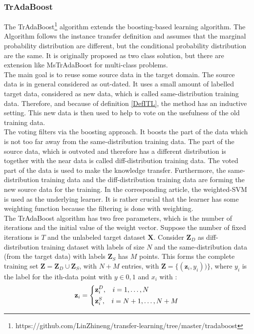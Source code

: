 \subsubsection{TrAdaBoost}
The TrAdaBoost\footnote{https://github.com/LinZhineng/transfer-learning/tree/master/tradaboost} algorithm extends the boosting-based learning algorithm.
The Algorithm follows the instance transfer definition and assumes that the marginal probability distribution are different, but the conditional probability distribution are the same.\cite{Dai.}
It is originally proposed as two class solution, but there are extension like MsTrAdaBoost for multi-class problems.\cite{Huang.2012}\\
The main goal is to reuse some source data in the target domain.
The source data is in general considered as out-dated.
It uses a small amount of labelled target data, considered as new data, which is called same-distribution training data.
Therefore, and because of definition \ref{DefITL}, the method has an inductive setting.
This new data is then used to help to vote on the usefulness of the old training data.\cite{Dai.}\\
The voting filters via the boosting approach.
It boosts the part of the data which is not too far away from the same-distribution training data.
The part of the source data, which is outvoted and therefore has a different distribution is together with the near data is called diff-distribution training data.
The voted part of the data is used to make the knowledge transfer.
Furthermore, the same-distribution training data and the diff-distribution training data are forming the new source data for the training.
In the corresponding article, the weighted-\acs{SVM} is used as the underlying learner.
It is rather crucial that the learner has some weighting function because the filtering is done with weighting.\cite{Dai.}\\
The TrAdaBoost algorithm has two free parameters, which is the number of iterations and the initial value of the weight vector.
Suppose the number of fixed iterations is $T$ and the unlabeled target dataset $\mathbf{X}$.
Consider $\mathbf{Z}_D$ as diff-distribution training dataset with labels of size $N$ and the same-distribution data (from the target data) with labels $\mathbf{Z}_S$ has $M$ points.
This forms the complete training set $\mathbf{Z}=\mathbf{Z}_D\cup \mathbf{Z}_S$, with $N+M$ entries, with $\mathbf{\mathbf{Z}}=\{(\mathbf{z}_i,y_i))\}$, where $y_i$ is the label for the ith-data point with $y\in {0,1}$ and $x_i$ with \cite{Dai.}:
\begin{equation*}
	\mathbf{z}_i = \begin{dcases}
						\mathbf{z}_i^D, \>\>\>\> i = 1,\dots,N\\
						\mathbf{z}_i^S, \>\>\>\> i = N +1,\dots,N+M
			  	   \end{dcases}
\end{equation*}
